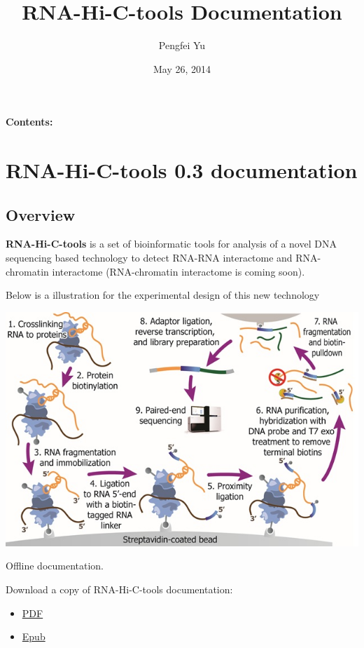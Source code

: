 \documentclass[letterpaper,10pt,english]{sphinxmanual}
\title{RNA-Hi-C-tools Documentation}
\date{May 26, 2014}
\author{Pengfei Yu}
\begin{document}
\maketitle
\tableofcontents
{}\label{index::doc}


\textbf{Contents:}


\chapter{RNA-Hi-C-tools 0.3 documentation}
\label{RNA-Hi-C-tools:welcome-to-rna-hi-c-tools-s-documentation}\label{RNA-Hi-C-tools::doc}\label{RNA-Hi-C-tools:rna-hi-c-tools-version-documentation}

\section{Overview}
\label{RNA-Hi-C-tools:overview}
\textbf{RNA-Hi-C-tools} is a set of bioinformatic tools for analysis of a novel DNA sequencing based technology to detect RNA-RNA interactome and RNA-chromatin interactome (RNA-chromatin interactome is coming soon).

Below is a illustration for the experimental design of this new technology

{\hfill\includegraphics{exp.jpg}\hfill}




Offline documentation.

Download a copy of RNA-Hi-C-tools documentation:
\begin{itemize}
\item {} 
\href{http://systemsbio.ucsd.edu/RNA-Hi-C/\_sources/Stitch-seq-tools.pdf}{PDF}

\item {} 
\href{https://media.readthedocs.org/epub/stitch-seq-tools/latest/stitch-seq-tools.epub}{Epub}

\end{itemize}
\end{document}
